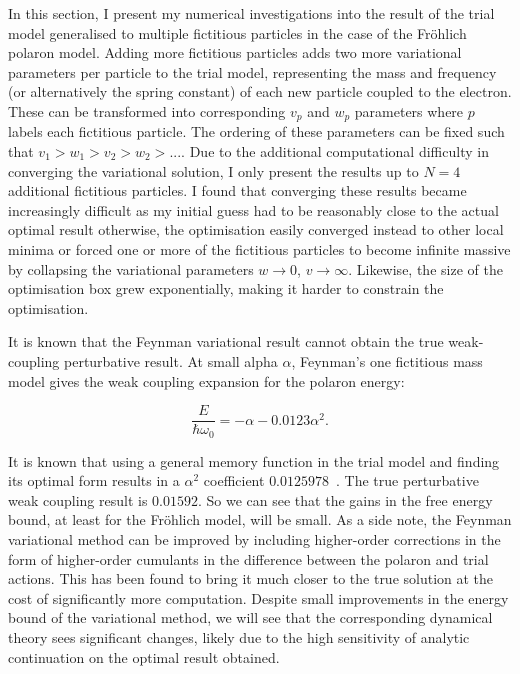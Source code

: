 In this section, I present my numerical investigations into the result of the trial model generalised to multiple fictitious particles in the case of the Fr\"ohlich polaron model. Adding more fictitious particles adds two more variational parameters per particle to the trial model, representing the mass and frequency (or alternatively the spring constant) of each new particle coupled to the electron. These can be transformed into corresponding $v_p$ and $w_p$ parameters where $p$ labels each fictitious particle. The ordering of these parameters can be fixed such that $v_1 > w_1 > v_2 > w_2 > ...$. Due to the additional computational difficulty in converging the variational solution, I only present the results up to $N=4$ additional fictitious particles. I found that converging these results became increasingly difficult as my initial guess had to be reasonably close to the actual optimal result otherwise, the optimisation easily converged instead to other local minima or forced one or more of the fictitious particles to become infinite massive by collapsing the variational parameters $w \to 0$, $v \to \infty$. Likewise, the size of the optimisation box grew exponentially, making it harder to constrain the optimisation.

It is known that the Feynman variational result cannot obtain the true weak-coupling perturbative result. At small alpha $\alpha$, Feynman's one fictitious mass model gives the weak coupling expansion for the polaron energy:

\begin{equation} \label{eqn:weakcoupling}
    \frac{E}{\hbar\omega_0} = -\alpha - 0.0123 \alpha^2.
\end{equation}

It is known that using a general memory function in the trial model and finding its optimal form results in a $\alpha^2$ coefficient $0.0125978$~\cite{rosenfelder_best_2001}. The true perturbative weak coupling result is $0.01592$. So we can see that the gains in the free energy bound, at least for the Fr\"ohlich model, will be small. As a side note, the Feynman variational method can be improved by including higher-order corrections in the form of higher-order cumulants in the difference between the polaron and trial actions. This has been found to bring it much closer to the true solution at the cost of significantly more computation. Despite small improvements in the energy bound of the variational method, we will see that the corresponding dynamical theory sees significant changes, likely due to the high sensitivity of analytic continuation on the optimal result obtained.

